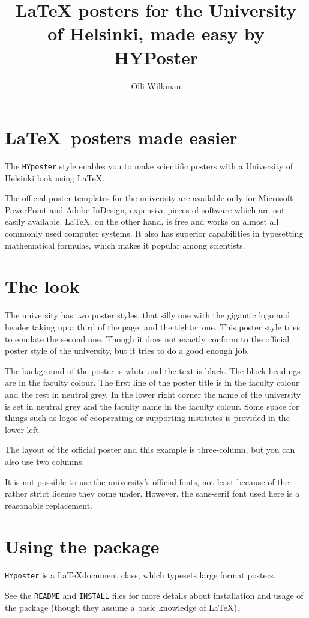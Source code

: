 \documentclass[a0paper,smallertitle]{test1}
\title{\LaTeX{} posters for the University of Helsinki, made easy by HYPoster}
\author{Olli Wilkman}
\affiliation{Department of Physics, University of Helsinki}
\begin{document}
\section*{\LaTeX~posters made easier}
The \texttt{HYposter} style enables you to make scientific posters with a University of Helsinki look using \LaTeX. 

The official poster templates for the university are available only for Microsoft PowerPoint and Adobe InDesign, expensive pieces of software which are not easily available. \LaTeX, on the other hand, is free and works on almost all commonly used computer systems. It also has superior capabilities in typesetting mathematical formulas, which makes it popular among scientists.


\section*{The look}
The university has two poster styles, that silly one with the gigantic logo and header taking up a third of the page, and the tighter one. This poster style tries to emulate the second one. Though it does not exactly conform to the official poster style of the university, but it tries to do a good enough job. 

The background of the poster is white and the text is black. The block headings are in the faculty colour. The first line of the poster title is in the faculty colour and the rest in neutral grey. In the lower right corner the name of the university is set in neutral grey and the faculty name in the faculty colour.
Some space for things such as logos of cooperating or supporting institutes is provided in the lower left.

The layout of the official poster and this example is three-column, but you can also use two columns.

It is not possible to use the university's official fonts, not least because of the rather strict license they come under. However, the sans-serif font used here is a reasonable replacement.


\section*{Using the package}
\texttt{HYposter} is a \LaTeX document class, which typesets large format posters.

See the \texttt{README} and \texttt{INSTALL} files for more details about installation and usage of the package (though they assume a basic knowledge of \LaTeX).
\end{document}
